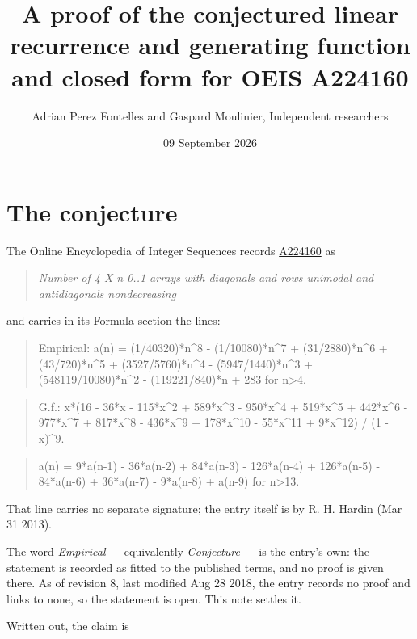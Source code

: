 \documentclass[11pt]{article}
\title{A proof of the conjectured linear recurrence and generating function and closed form for OEIS A224160}
\author{Adrian Perez Fontelles and Gaspard Moulinier, Independent researchers}
\date{09 September 2026}
\theoremstyle{definition}
\begin{document}
\maketitle
\section{The conjecture}

The Online Encyclopedia of Integer Sequences records \href{https://oeis.org/A224160}{A224160} as

\begin{quote}\itshape Number of 4 X n 0..1 arrays with diagonals and rows unimodal and antidiagonals nondecreasing\end{quote}

and carries in its Formula section the lines:

\begin{quote}\ttfamily Empirical: a(n) = (1/40320)*n\textasciicircum{}8 - (1/10080)*n\textasciicircum{}7 + (31/2880)*n\textasciicircum{}6 + (43/720)*n\textasciicircum{}5 + (3527/5760)*n\textasciicircum{}4 - (5947/1440)*n\textasciicircum{}3 + (548119/10080)*n\textasciicircum{}2 - (119221/840)*n + 283 for n>4.\end{quote}

\begin{quote}\ttfamily G.f.: x*(16 - 36*x - 115*x\textasciicircum{}2 + 589*x\textasciicircum{}3 - 950*x\textasciicircum{}4 + 519*x\textasciicircum{}5 + 442*x\textasciicircum{}6 - 977*x\textasciicircum{}7 + 817*x\textasciicircum{}8 - 436*x\textasciicircum{}9 + 178*x\textasciicircum{}10 - 55*x\textasciicircum{}11 + 9*x\textasciicircum{}12) / (1 - x)\textasciicircum{}9.\end{quote}

\begin{quote}\ttfamily a(n) = 9*a(n-1) - 36*a(n-2) + 84*a(n-3) - 126*a(n-4) + 126*a(n-5) - 84*a(n-6) + 36*a(n-7) - 9*a(n-8) + a(n-9) for n>13.\end{quote}

That line carries no separate signature; the entry itself is by R. H. Hardin (Mar 31 2013).

The word {\itshape Empirical} --- equivalently {\itshape Conjecture} --- is the entry's own: the statement is recorded as fitted to the published terms, and no proof is given there. As of revision 8, last modified Aug 28 2018, the entry records no proof and links to none, so the statement is open. This note settles it.

Written out, the claim is
\end{document}
